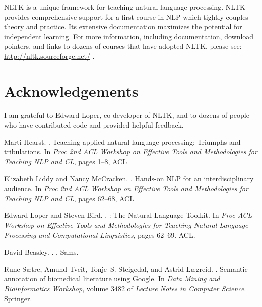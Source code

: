 \documentclass[11pt]{article}
\begin{document}
NLTK is a unique framework for teaching natural language processing.
NLTK provides comprehensive support for a first course in NLP which
tightly couples theory and practice.  Its extensive documentation
maximizes the potential for independent learning.  For more
information, including documentation, download pointers, and links to
dozens of courses that have adopted NLTK, please see:
\url{http://nltk.sourceforge.net/} .

\section*{Acknowledgements}

I am grateful to Edward Loper, co-developer of NLTK, and to dozens of
people who have contributed code and provided helpful feedback.
\vspace{-2ex}



\begin{thebibliography}{}
\setlength{\parskip}{0pt}
\setlength{\itemsep}{0pt}

Marti Hearst.
.
\newblock Teaching applied natural language processing: Triumphs and
  tribulations.
\newblock In {\em Proc 2nd ACL Workshop on Effective Tools and
  Methodologies for Teaching NLP and CL}, pages 1--8, ACL

Elizabeth Liddy and Nancy McCracken.
.
\newblock Hands-on {NLP} for an interdisciplinary audience.
\newblock In {\em Proc 2nd ACL Workshop on Effective Tools and
  Methodologies for Teaching NLP and CL}, pages 62--68, ACL

Edward Loper and Steven Bird.
.
: The Natural Language Toolkit.
\newblock In {\em Proc ACL Workshop on Effective Tools and
  Methodologies for Teaching Natural Language Processing and Computational
  Linguistics}, pages 62--69. ACL.

David Beasley.
.
.
\newblock Sams.

Rune S{\ae}tre, Amund Tveit, Tonje~S. Steigedal, and Astrid L{\ae}greid.
.
\newblock Semantic annotation of biomedical literature using Google.
\newblock In {\em Data Mining and Bioinformatics Workshop}, volume 3482 of {\em
  Lecture Notes in Computer Science}. Springer.

\end{thebibliography}
\end{document}
